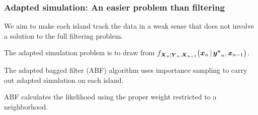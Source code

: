 \documentclass{beamer}
\begin{document}
\begin{frame}
  \frametitle{Adapted simulation: An easier problem than filtering}

  \begin{myitemize}
  \item
    We aim to make each island track the data in a weak sense that does not involve a solution to the full filtering problem.

\vspace{3mm}

  \item
    The adapted simulation problem is to draw from
$f_{\boldsymbol{X}_{n}|\boldsymbol{Y}_{n},\boldsymbol{X}_{n-1}}
  \big(
    \boldsymbol{x}_{n}{\,\vert\,} \boldsymbol{y^*}_{n},\boldsymbol{x}_{n-1}
  \big)$.

\vspace{3mm}

  \item The adapted bagged filter (ABF) algorithm uses importance sampling to carry out adapted simulation on each island.


\vspace{3mm}

    \item ABF calculates the likelihood using the proper weight restricted to a neighborhood.
\end{myitemize}
    
\end{frame}
\end{document}
